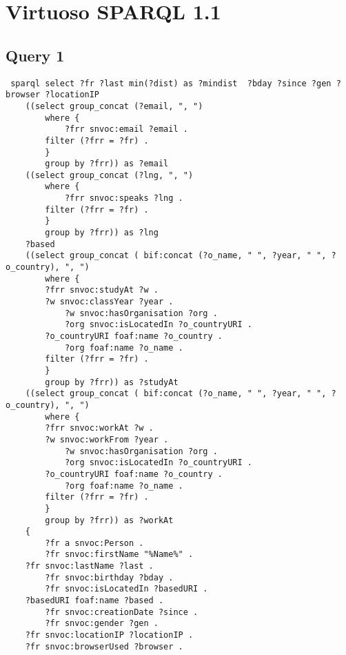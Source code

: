 

\section{Virtuoso SPARQL 1.1}

\subsection{Query 1} 

\begin{verbatim}
 sparql select ?fr ?last min(?dist) as ?mindist  ?bday ?since ?gen ?browser ?locationIP 
    ((select group_concat (?email, ", ")
        where {
            ?frr snvoc:email ?email .
        filter (?frr = ?fr) .
        }
        group by ?frr)) as ?email
    ((select group_concat (?lng, ", ")
        where {
            ?frr snvoc:speaks ?lng .
        filter (?frr = ?fr) .
        }
        group by ?frr)) as ?lng
    ?based
    ((select group_concat ( bif:concat (?o_name, " ", ?year, " ", ?o_country), ", ")
        where {
        ?frr snvoc:studyAt ?w .
        ?w snvoc:classYear ?year .
            ?w snvoc:hasOrganisation ?org .
            ?org snvoc:isLocatedIn ?o_countryURI .
        ?o_countryURI foaf:name ?o_country .
            ?org foaf:name ?o_name .
        filter (?frr = ?fr) .
        }
        group by ?frr)) as ?studyAt
    ((select group_concat ( bif:concat (?o_name, " ", ?year, " ", ?o_country), ", ")
        where {
        ?frr snvoc:workAt ?w .
        ?w snvoc:workFrom ?year .
            ?w snvoc:hasOrganisation ?org .
            ?org snvoc:isLocatedIn ?o_countryURI .
        ?o_countryURI foaf:name ?o_country .
            ?org foaf:name ?o_name .
        filter (?frr = ?fr) .
        }
        group by ?frr)) as ?workAt
    {
        ?fr a snvoc:Person .
        ?fr snvoc:firstName "%Name%" .
    ?fr snvoc:lastName ?last .
        ?fr snvoc:birthday ?bday .
        ?fr snvoc:isLocatedIn ?basedURI .
    ?basedURI foaf:name ?based .
        ?fr snvoc:creationDate ?since .
        ?fr snvoc:gender ?gen .
    ?fr snvoc:locationIP ?locationIP .
    ?fr snvoc:browserUsed ?browser .


\end{verbatim}
